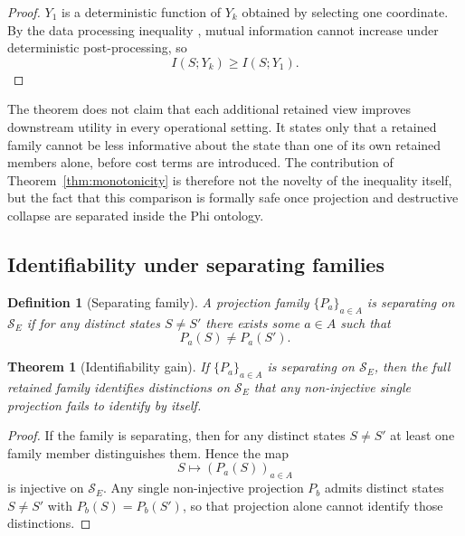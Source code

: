 \documentclass[11pt,a4paper]{article}
\newtheorem{definition}{Definition}
\newtheorem{theorem}{Theorem}
\begin{document}
\begin{proof}
$Y_1$ is a deterministic function of $Y_k$ obtained by selecting one coordinate. By the data processing inequality \cite{cover2006elements}, mutual information cannot increase under deterministic post-processing, so
\begin{equation}
I(S;Y_k) \geq I(S;Y_1).
\end{equation}
\end{proof}

The theorem does not claim that each additional retained view improves downstream utility in every operational setting. It states only that a retained family cannot be less informative about the state than one of its own retained members alone, before cost terms are introduced.
The contribution of Theorem~\ref{thm:monotonicity} is therefore not the novelty of the inequality itself, but the fact that this comparison is formally safe once projection and destructive collapse are separated inside the Phi ontology.

\subsection{Identifiability under separating families}
\label{sec:ident}

\begin{definition}[Separating family]
A projection family $\{P_a\}_{a \in A}$ is separating on $\mathcal{S}_E$ if for any distinct states $S \neq S'$ there exists some $a \in A$ such that
\begin{equation}
P_a(S) \neq P_a(S').
\end{equation}
\end{definition}

\begin{theorem}[Identifiability gain]
\label{thm:ident}
If $\{P_a\}_{a \in A}$ is separating on $\mathcal{S}_E$, then the full retained family identifies distinctions on $\mathcal{S}_E$ that any non-injective single projection fails to identify by itself.
\end{theorem}

\begin{proof}
If the family is separating, then for any distinct states $S \neq S'$ at least one family member distinguishes them. Hence the map
\begin{equation}
S \mapsto (P_a(S))_{a \in A}
\end{equation}
is injective on $\mathcal{S}_E$. Any single non-injective projection $P_b$ admits distinct states $S \neq S'$ with $P_b(S)=P_b(S')$, so that projection alone cannot identify those distinctions.
\end{proof}
\end{document}
